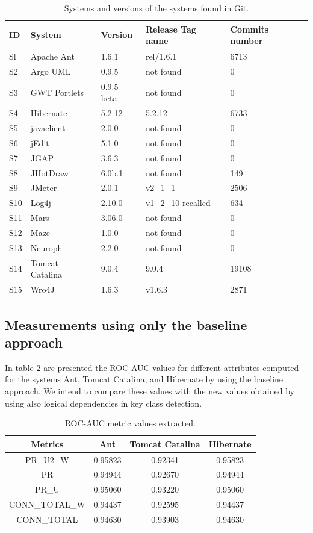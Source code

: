 \documentclass[runningheads]{comsis2}
\begin{document}
\begin{table}
\renewcommand{\arraystretch}{1}
\caption{Systems and versions of the systems found in Git. }
\label{tab:gitfoundsystems}
\centering
\begin{tabular}{lllll}
\hline
ID	&	System	&	Version	&	Release Tag name	&	Commits number	\\
\hline
Sl	&	Apache Ant	&	1.6.1	&	rel/1.6.1	&	6713	\\
S2	&	Argo UML	&	0.9.5	&	not found	&	0	\\
S3	&	GWT Portlets	&	0.9.5 beta	&	not found	&	0	\\
S4	&	Hibernate 	&	5.2.12	&	5.2.12	&	6733	\\
S5	&	javaclient	&	2.0.0	&	not found	&	0	\\
S6	&	jEdit	&	5.1.0	&	not found	&	0	\\
S7	&	JGAP	&	3.6.3	&	not found	&	0	\\
S8	&	JHotDraw	&	6.0b.1	&	not found	&	149	\\
S9	&	JMeter	&	2.0.1	&	v2\_1\_1	&	2506	\\
S10	&	Log4j	&	2.10.0	&	v1\_2\_10-recalled	&	634	\\
S11	&	Mars	&	3.06.0	&	not found	&	0	\\
S12	&	Maze	&	1.0.0	&	not found	&	0	\\
S13	&	Neuroph	&	2.2.0	&	not found	&	0	\\
S14	&	Tomcat Catalina	&	9.0.4	&	9.0.4	&	19108	\\
S15	&	Wro4J	&	1.6.3	&	v1.6.3	&	2871	\\
\hline
\end{tabular}
\end{table}

\subsection{Measurements using only the baseline approach}
\label{sec:measure_baseline}

In table \ref{tab:previousresults} are presented the ROC-AUC values for different attributes computed for the systems Ant, Tomcat Catalina, and Hibernate by using the baseline approach. We intend to compare these values with the new values obtained by using also logical dependencies in key class detection.

\begin{table}
\renewcommand{\arraystretch}{1}
\caption{ROC-AUC metric values extracted. }
\label{tab:previousresults}
\centering
\begin{tabular}{|c|ccc|}
\hline
Metrics &	Ant	&	Tomcat Catalina	&	Hibernate	\\
\hline

PR\_U2\_W	&	0.95823	&	0.92341	&	0.95823	\\
PR	&	0.94944	&	0.92670	&	0.94944	\\
PR\_U	&	0.95060	&	0.93220	&	0.95060	\\
CONN\_TOTAL\_W	&	0.94437	&	0.92595	&	0.94437	\\
CONN\_TOTAL	&	0.94630	&	0.93903	&	0.94630	\\
\hline
\end{tabular}
\end{table}
\end{document}
